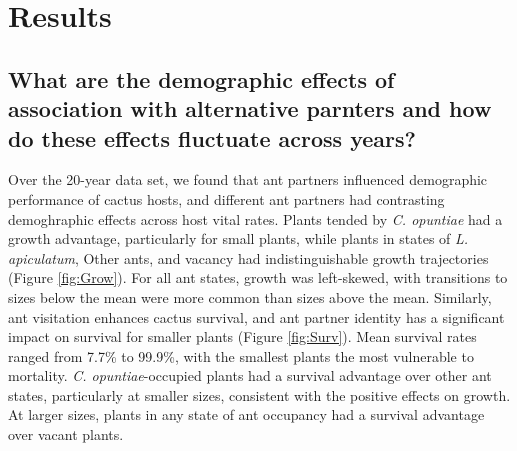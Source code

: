\documentclass[11pt]{article}
\begin{document}
 
\section*{Results}
\subsection*{What are the demographic effects of association with alternative parnters and how do these effects fluctuate across years?}
Over the 20-year data set, we found that ant partners influenced demographic performance of cactus hosts, and different ant partners had contrasting demoghraphic effects across host vital rates. 
Plants tended by \textit{C. opuntiae} had a growth advantage, particularly for small plants, while plants in states of \textit{L. apiculatum}, Other ants, and vacancy had indistinguishable growth trajectories (Figure \ref{fig:Grow}).
For all ant states, growth was left-skewed, with transitions to sizes below the mean were more common than sizes above the mean. 
Similarly, ant visitation enhances cactus survival, and ant partner identity has a significant impact on survival for smaller plants (Figure \ref{fig:Surv}).
Mean survival rates ranged from 7.7\% to 99.9\%, with the smallest plants the most vulnerable to mortality. 
\textit{C. opuntiae}-occupied plants had a survival advantage over other ant states, particularly at smaller sizes, consistent with the positive effects on growth. 
At larger sizes, plants in any state of ant occupancy had a survival advantage over vacant plants. 
\end{document}

